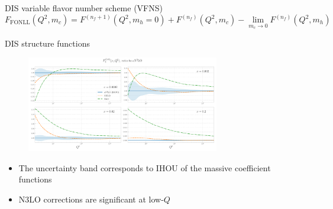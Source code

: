 \documentclass[8pt,t]{beamer}
\begin{document}
\begin{frame}{DIS variable flavor number scheme (VFNS)}
  \vspace*{1em}
  \begin{equation*}
    F_\mathrm{FONLL}(Q^2,m_c) =F^{(n_f+1)}(Q^2,m_h=0)
    +F^{(n_f)}(Q^2,m_c)-\lim_{m_c\rightarrow 0}F^{(n_f)}(Q^2,m_h)
  \end{equation*}



\end{frame}




\begin{frame}{DIS structure functions}
  \begin{figure}[!t]
    \centering
    \includegraphics[width=0.75\textwidth]{figures/F2_total.pdf}
  \end{figure}
  \begin{itemize}
    \item The uncertainty band corresponds to IHOU of the massive coefficient functions
    \item N3LO corrections are significant at low-$Q$
  \end{itemize}
\end{frame}
\end{document}

